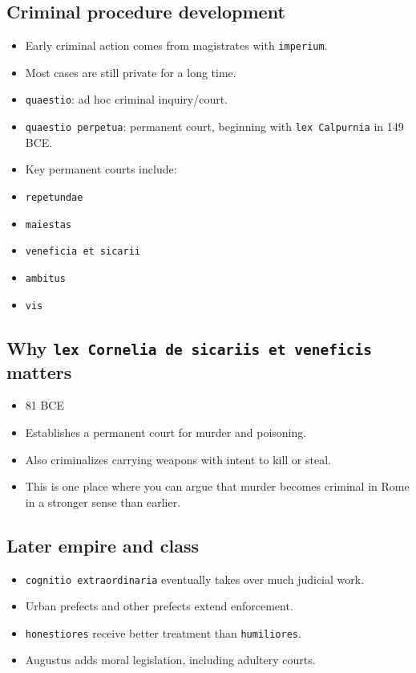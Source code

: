 \documentclass[11pt]{article}
\begin{document}
\subsection{Criminal procedure development}

\begin{itemize}
\item Early criminal action comes from magistrates with \texttt{imperium}.
\item Most cases are still private for a long time.
\item \texttt{quaestio}: ad hoc criminal inquiry/court.
\item \texttt{quaestio perpetua}: permanent court, beginning with \texttt{lex Calpurnia} in 149 BCE.
\item Key permanent courts include:
\item \texttt{repetundae}
\item \texttt{maiestas}
\item \texttt{veneficia et sicarii}
\item \texttt{ambitus}
\item \texttt{vis}
\end{itemize}

\subsection{Why \texttt{lex Cornelia de sicariis et veneficis} matters}

\begin{itemize}
\item 81 BCE
\item Establishes a permanent court for murder and poisoning.
\item Also criminalizes carrying weapons with intent to kill or steal.
\item This is one place where you can argue that murder becomes criminal in Rome in a stronger sense than earlier.
\end{itemize}

\subsection{Later empire and class}

\begin{itemize}
\item \texttt{cognitio extraordinaria} eventually takes over much judicial work.
\item Urban prefects and other prefects extend enforcement.
\item \texttt{honestiores} receive better treatment than \texttt{humiliores}.
\item Augustus adds moral legislation, including adultery courts.
\end{itemize}
\end{document}

